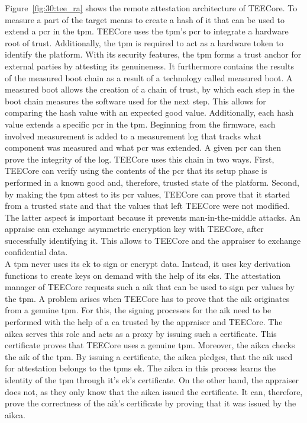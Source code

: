 Figure~\ref{fig:30:tee_ra} shows the remote attestation architecture of TEECore.
To measure a part of the target means to create a hash of it that can be used to
extend a \gls{pcr} in the \gls{tpm}. TEECore uses the \gls{tpm}'s \gls{pcr} to
integrate a hardware root of trust. Additionally, the \gls{tpm} is required to
act as a hardware token to identify the platform. With its security features,
the \gls{tpm} forms a trust anchor for external parties by attesting its
genuineness. It furthermore contains the results of the measured boot chain as a
result of a technology called measured boot. A measured boot allows the creation
of a chain of trust, by which each step in the boot chain measures the software
used for the next step. This allows for comparing the hash value with an
expected good value. Additionally, each hash value extends a specific \gls{pcr}
in the \gls{tpm}. Beginning from the firmware, each involved measurement is
added to a measurement log that tracks what component was measured and what
\gls{pcr} was extended. A given \gls{pcr} can then prove the integrity of the
log. TEECore uses this chain in two ways. First, TEECore can verify using the
contents of the \gls{pcr} that its setup phase is performed in a known good and,
therefore, trusted state of the platform. Second, by making the \gls{tpm} attest
to its \gls{pcr} values, TEECore can prove that it started from a trusted state
and that the values that left TEECore were not modified. The latter aspect is
important because it prevents man-in-the-middle attacks. An appraise can
exchange asymmetric encryption key with TEECore, after successfully identifying
it. This allows to TEECore and the appraiser to exchange confidential data.\\

A \gls{tpm} never uses its \gls{ek} to sign or encrypt data. Instead, it uses
key derivation functions to create keys on demand with the help of its
\glspl{ek}. The attestation manager of TEECore requests such a \gls{aik} that
can be used to sign \gls{pcr} values by the \gls{tpm}. A problem arises when
TEECore has to prove that the \gls{aik} originates from a genuine \gls{tpm}. For
this, the signing processes for the \gls{aik} need to be performed with the help
of a \gls{ca} trusted by the appraiser and TEECore. The \gls{aikca} serves this
role and acts as a proxy by issuing such a certificate. This certificate proves
that TEECore uses a genuine \gls{tpm}. Moreover, the \gls{aikca} checks the
\gls{aik} of the \gls{tpm}. By issuing a certificate, the \gls{aikca} pledges,
that the \gls{aik} used for attestation belongs to the \gls{tpm}s \gls{ek}.
The \gls{aikca} in this process learns the identity of the \gls{tpm} through
it's \gls{ek}'s certificate. On the other hand, the appraiser does not, as they
only know that the \gls{aikca} issued the certificate. It can, therefore, prove
the correctness of the \gls{aik}'s certificate by proving that it was issued by
the \gls{aikca}.\\


